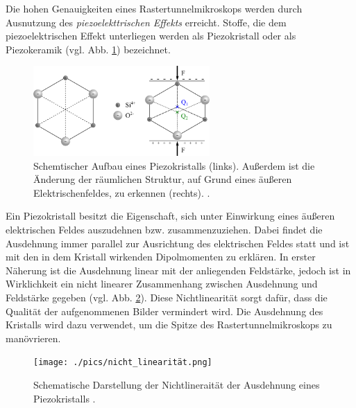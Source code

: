 Die hohen Genauigkeiten eines Rastertunnelmikroskops werden durch Ausnutzung des
\emph{piezoelekttrischen Effekts} erreicht. %
Stoffe, die dem piezoelektrischen Effekt unterliegen werden als Piezokristall %
oder als Piezokeramik (vgl. Abb. \ref{fig: piezo}) bezeichnet.
\begin{figure}[!h]
  \centering
  \includegraphics[width=0.6\textwidth]{./pics/piezo.png}
  \caption{Schemtischer Aufbau eines Piezokristalls (links). Außerdem ist die Änderung der räumlichen Struktur, auf Grund eines
  äußeren Elektrischenfeldes, zu erkennen (rechts). \cite{piezo}.}
  \label{fig: piezo}
\end{figure}
Ein Piezokristall besitzt die Eigenschaft, sich unter Einwirkung eines äußeren
elektrischen Feldes auszudehnen bzw. zusammenzuziehen.
Dabei findet die Ausdehnung immer parallel zur
Ausrichtung des elektrischen Feldes statt und ist mit den in dem Kristall wirkenden
Dipolmomenten zu erklären. In erster Näherung ist die Ausdehnung linear mit der anliegenden Feldstärke,
jedoch ist in Wirklichkeit ein nicht linearer Zusammenhang zwischen Ausdehnung und Feldstärke
gegeben (vgl. Abb. \ref{fig: non_linear}). Diese Nichtlinearität sorgt dafür, dass die Qualität der aufgenommenen Bilder
vermindert wird. Die Ausdehnung des Kristalls wird dazu verwendet, um die Spitze des Rastertunnelmikroskops zu manövrieren.
\begin{figure}[!h]
  \centering
  \texttt{[image: ./pics/nicht\_linearität.png]}
  \caption{Schematische Darstellung der Nichtlineraität der Ausdehnung eines Piezokristalls \cite{rtm}.} %
  \label{fig: non_linear}
\end{figure}

